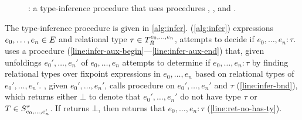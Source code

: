 \begin{figure}
  \centering
\begin{algorithm}[H]
  \caption{ \sys: a type-inference procedure that uses procedures
    \inferbnd, \chkinductive, and \unfoldexp. }
  \label{alg:infer}
\end{algorithm}
\end{figure}

The type-inference procedure \sys is given in \autoref{alg:infer}.
%
\sys (\autoref{alg:infer}) expressions $e_0, \ldots, e_n \in E$
and relational type $\tau \in T_{R}^{e_0, \ldots, e_n}$, attempts
to decide if $e_0, \ldots, e_n : \tau$.
%
\sys uses a procedure \inferaux
(\autoref{line:infer-aux-begin}---\autoref{line:infer-aux-end}) that,
given unfoldings $e_0', \ldots, e_n'$ of $e_0, \ldots, e_n$ attempts
to determine if $e_0, \ldots, e_n : \tau$ by finding relational types
over fixpoint expressions in $e_0, \ldots, e_n$ based on relational
types of $e_0', \ldots, e_n'$.
%
\sys, given $e_0', \ldots, e_n'$, calls procedure \inferbnd on
$e_0', \ldots, e_n'$ and $\tau$ (\autoref{line:infer-bnd}), which
returns either $\bot$ to denote that $e_0', \ldots, e_n'$ do not have
type $\tau$ or $T \in S_{ e_0, \ldots, e_n' }^{ \tau }$.
If \inferbnd returns $\bot$, then \sys returns that
$e_0, \ldots, e_n : \tau$ (\autoref{line:ret-no-has-ty}).

